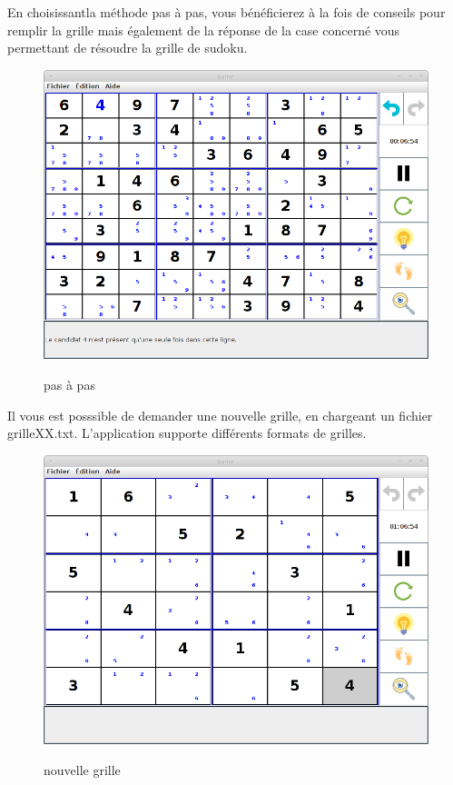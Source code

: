 \newpage
En choisissantla méthode pas à pas, vous bénéficierez à la fois de conseils
pour remplir la grille mais également de la réponse de la case concerné 
vous permettant de résoudre la grille de sudoku. 
\begin{figure}[ht]
  \caption{\label{annexe14} pas à pas}
  \includegraphics [width=130mm]{images/pas.png} \\[0.5cm]
\end{figure}

\newpage
Il vous est posssible de demander une nouvelle grille, en chargeant 
un fichier grilleXX.txt. L'application supporte différents formats de grilles. 
\begin{figure}[ht]
  \caption{\label{annexe15} nouvelle grille}
  \includegraphics [width=130mm]{images/newGrid.png} \\[0.5cm]
\end{figure}


